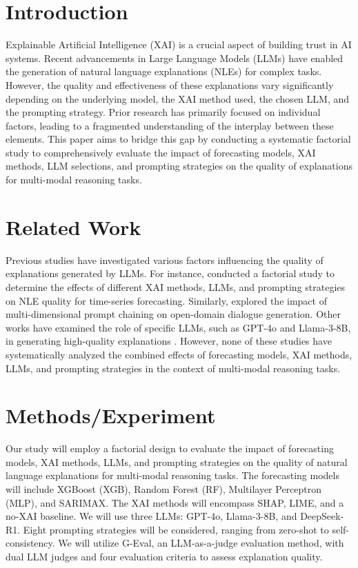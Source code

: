 \section{Introduction}
\label{sec:introduction}
Explainable Artificial Intelligence (XAI) is a crucial aspect of building trust in AI systems. Recent advancements in Large Language Models (LLMs) have enabled the generation of natural language explanations (NLEs) for complex tasks. However, the quality and effectiveness of these explanations vary significantly depending on the underlying model, the XAI method used, the chosen LLM, and the prompting strategy. Prior research has primarily focused on individual factors, leading to a fragmented understanding of the interplay between these elements. This paper aims to bridge this gap by conducting a systematic factorial study to comprehensively evaluate the impact of forecasting models, XAI methods, LLM selections, and prompting strategies on the quality of explanations for multi-modal reasoning tasks.

\section{Related Work}
\label{sec:related_work}
Previous studies have investigated various factors influencing the quality of explanations generated by LLMs. For instance, \cite{lukassen2026xaistoriesfactorialstudy} conducted a factorial study to determine the effects of different XAI methods, LLMs, and prompting strategies on NLE quality for time-series forecasting. Similarly, \cite{teng2026multidimensionalpromptchainingimprove} explored the impact of multi-dimensional prompt chaining on open-domain dialogue generation. Other works have examined the role of specific LLMs, such as GPT-4o and Llama-3-8B, in generating high-quality explanations \cite{tomar2026doesprefixmatterreasoning}. However, none of these studies have systematically analyzed the combined effects of forecasting models, XAI methods, LLMs, and prompting strategies in the context of multi-modal reasoning tasks.

\section{Methods/Experiment}
\label{sec:methods}
Our study will employ a factorial design to evaluate the impact of forecasting models, XAI methods, LLMs, and prompting strategies on the quality of natural language explanations for multi-modal reasoning tasks. The forecasting models will include XGBoost (XGB), Random Forest (RF), Multilayer Perceptron (MLP), and SARIMAX. The XAI methods will encompass SHAP, LIME, and a no-XAI baseline. We will use three LLMs: GPT-4o, Llama-3-8B, and DeepSeek-R1. Eight prompting strategies will be considered, ranging from zero-shot to self-consistency. We will utilize G-Eval, an LLM-as-a-judge evaluation method, with dual LLM judges and four evaluation criteria to assess explanation quality.

